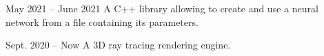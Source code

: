 \documentclass[10pt,a4paper,ragged2e,withhyper]{altacv}
\begin{document}
\begin{paracol}{2}
            {May 2021 -- June 2021}{}
            A C++ library allowing to create and use a neural network from a file containing its parameters.\\

            \divider
            
            {Sept. 2020 -- Now}{}
            A 3D ray tracing rendering engine.\\
            \\
    \end{paracol}
\end{document}
